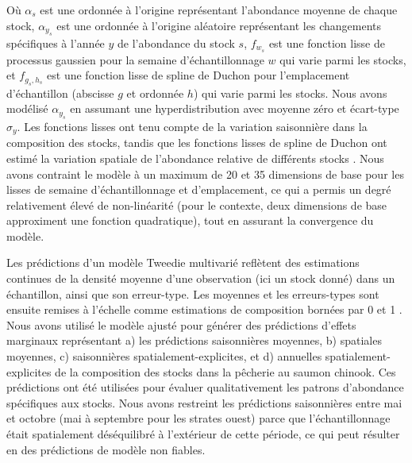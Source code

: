 Où $\alpha_s$ est une ordonnée à l'origine représentant l'abondance moyenne de chaque stock, $\alpha_{y_s}$ est une ordonnée à l'origine aléatoire représentant les changements spécifiques à l'année $y$ de l'abondance du stock $s$, $f_{w_s}$ est une fonction lisse de processus gaussien pour la semaine d'échantillonnage $w$ qui varie parmi les stocks, et $f_{g_s,h_s}$ est une fonction lisse de spline de Duchon pour l'emplacement d'échantillon (abscisse $g$ et ordonnée $h$) qui varie parmi les stocks. Nous avons modélisé $\alpha_{y_s}$ en assumant une hyperdistribution avec moyenne zéro et écart-type $\sigma_y$. Les fonctions lisses ont tenu compte de la variation saisonnière dans la composition des stocks, tandis que les fonctions lisses de spline de Duchon ont estimé la variation spatiale de l'abondance relative de différents stocks \citep{thorsonDietAnalysisUsing2022}. Nous avons contraint le modèle à un maximum de 20 et 35 dimensions de base pour les lisses de semaine d'échantillonnage et d'emplacement, ce qui a permis un degré relativement élevé de non-linéarité (pour le contexte, deux dimensions de base approximent une fonction quadratique), tout en assurant la convergence du modèle.

Les prédictions d'un modèle Tweedie multivarié reflètent des estimations continues de la densité moyenne d'une observation (ici un stock donné) dans un échantillon, ainsi que son erreur-type. Les moyennes et les erreurs-types sont ensuite remises à l'échelle comme estimations de composition bornées par 0 et 1 \citep{thorsonDietAnalysisUsing2022, thorsonMultivariateTweedieSelfweightingLikelihood2023}. Nous avons utilisé le modèle ajusté pour générer des prédictions d'effets marginaux représentant a) les prédictions saisonnières moyennes, b) spatiales moyennes, c) saisonnières spatialement-explicites, et d) annuelles spatialement-explicites de la composition des stocks dans la pêcherie au saumon chinook. Ces prédictions ont été utilisées pour évaluer qualitativement les patrons d'abondance spécifiques aux stocks. Nous avons restreint les prédictions saisonnières entre mai et octobre (mai à septembre pour les strates ouest) parce que l'échantillonnage était spatialement déséquilibré à l'extérieur de cette période, ce qui peut résulter en des prédictions de modèle non fiables.

